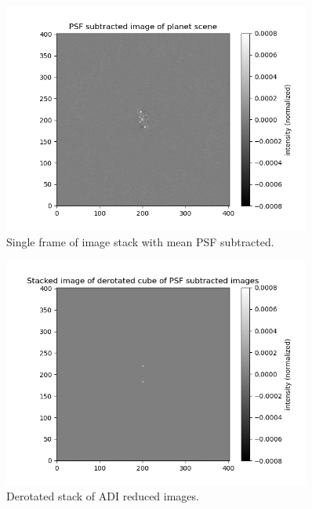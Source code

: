 \begin{figure}[!ht]
  \centering
  \includegraphics[width=0.9\textwidth]{./figures/adi_meansub.png}
  \caption{Single frame of image stack with mean PSF subtracted.}
  \label{fig:adi_3}
\end{figure}

\begin{figure}[!ht]
  \centering
  \includegraphics[width=0.9\textwidth]{./figures/adi_derotstack.png}
  \caption{Derotated stack of ADI reduced images.}
  \label{fig:adi_4}
\end{figure}

